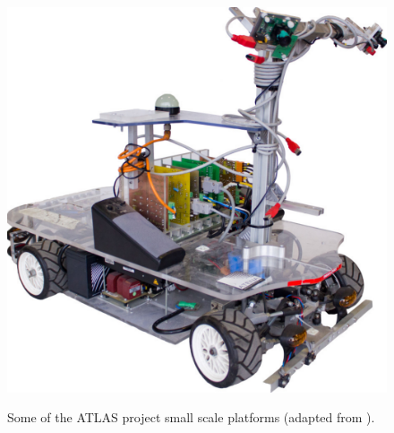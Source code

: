 \begin{figure}[!h]
\begin{minipage}[t]{0.32\textwidth}
			\label{fig:modelosatlas2}
		\end{minipage}
		\begin{minipage}[t]{0.32\textwidth}
			\includegraphics[width=\textwidth]{../figure/modelosatlas3.pdf}
			\label{fig:modelosatlas3}
		\end{minipage}
		\caption{Some of the ATLAS project small scale platforms (adapted from \cite{Pereira2012}).}
		\label{fig:modelosatlas}
\end{figure}

